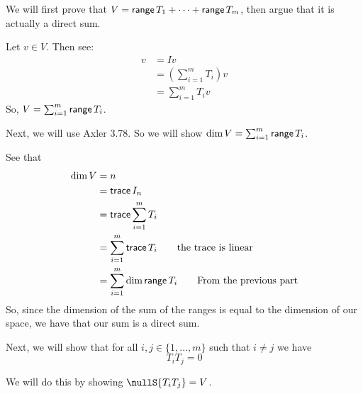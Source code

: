 \documentclass[answers]{exam}
\begin{document}
\begin{questions}
\begin{parts}
\begin{solution}
             We will first prove that $V = \mathsf{range}\,{T_1} + \dots + \mathsf{range}\,{T_m}$, then argue
            that it is actually a direct sum.

            Let $v\in V$. Then see:
            \begin{align*}
                v &= Iv \\
                &= \left(\sum_{i=1}^mT_i\right)v \\
                &= \sum_{i=1}^mT_iv
            \end{align*}
            So, $V = \sum_{i=1}^m\mathsf{range}\,{T_i}$. 

            Next, we will use Axler 3.78. So we will show $\text{dim}\, V = \sum_{i=1}^m\mathsf{range}\,{T_i}$.

            See that
            \begin{align*}
                \text{dim}\,{V} &= n\\
                &= \mathsf{trace}\,{I_n}\\
                &= \mathsf{trace}\,{\sum_{i=1}^mT_i}\\
                &= \sum_{i=1}^m\mathsf{trace}\,{T_i}\qquad\text{the trace is linear} \\
                &= \sum_{i=1}^m\text{dim}\,{\mathsf{range}\,{T_i}}\qquad\text{From the previous part}
            \end{align*}
            So, since the dimension of the sum of the ranges is equal to the dimension of our space, we have that
            our sum is a direct sum.

            Next, we will show that for all $i,j\in\{1,\dots,m\}$ such that $i\neq j$ we have
            \[
                T_iT_j = 0
            \]

            We will do this by showing $\nullS{T_iT_j} = V$. 


\end{solution}
\end{parts}
\end{questions}
\end{document}
